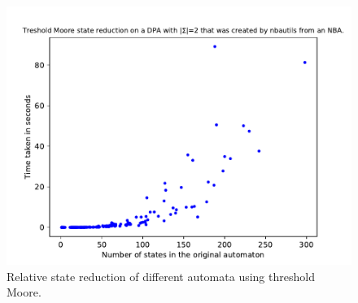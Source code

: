 \begin{figure}
\begin{minipage}{0.49\textwidth}
		\includegraphics[page=5,height=.3\textheight]{../data/analysis/threshold_moore/detnbaut_ap1.pdf} 
		\caption{Relative state reduction of different automata using threshold Moore.}
		\label{exp:fig:threshold_moore_reduct_prios}
	\end{minipage}
\end{figure}

